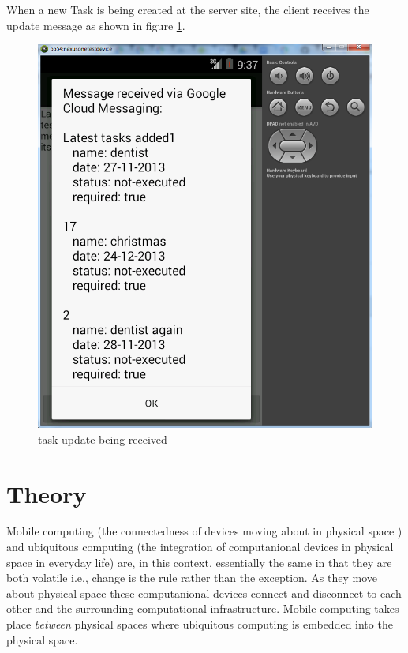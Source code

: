 When a new Task is being created at the server site, the client receives the update message as shown in figure \ref{mobile_task_update_figure}.
\begin{figure}[ht]
	\centering
	\includegraphics[scale=0.7]{images/googlecloud__tasksindevice.png}
	\caption{task update being received}
	\label{mobile_task_update_figure}
\end{figure}


\section{Theory}

Mobile computing (the connectedness of devices moving about in physical space ) and ubiquitous computing (the integration of computanional devices in physical space in everyday life) are, in this context, essentially the same in that they are both volatile i.e., change is the rule rather than the exception. As they move about physical space these computanional devices connect and disconnect to each other and the surrounding computational infrastructure. Mobile computing takes place \textit{between} physical spaces where ubiquitous computing is embedded into the physical space. \\

